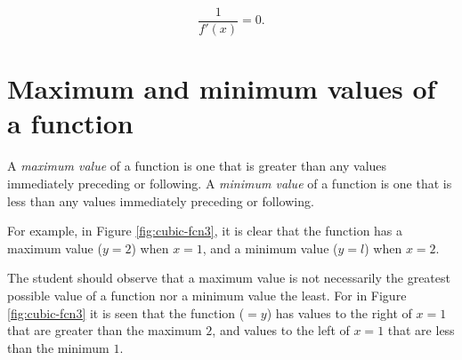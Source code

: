 \[
    \frac{1}{f'(x)} = 0.
\]

\section{Maximum and minimum values of a function}
\label{sec:82}

A {\it maximum value} of a function is one that is greater 
than any values immediately preceding or following.
A {\it minimum value} of a function is one that is less than 
any values immediately preceding or following.

For example, in Figure \ref{fig:cubic-fcn3}, it is clear that the 
function has a maximum value ($y = 2$) when $x = 1$, and a 
minimum value ($y = l$) when $x = 2$.

The student should observe that a maximum value is not 
necessarily the greatest possible value of a function nor a 
minimum value the least. For in Figure \ref{fig:cubic-fcn3} it is seen that 
the function ($= y$) has values to the right of $x=1$ that are 
greater than the maximum $2$, and values to the left of $x=1$ that 
are less than the minimum $1$.

